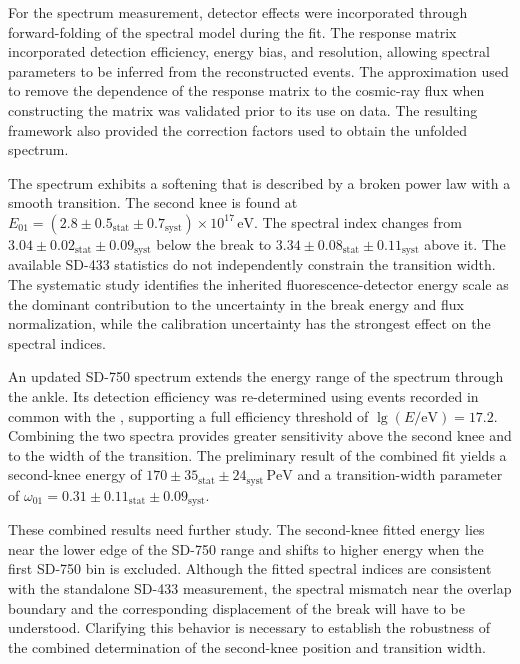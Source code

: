 \documentclass[main.tex]{subfiles}
\begin{document}
For the spectrum measurement, detector effects were incorporated through forward-folding of the spectral model during the fit.
The response matrix incorporated detection efficiency, energy bias, and resolution, allowing spectral parameters to be inferred from the reconstructed events.
The approximation used to remove the dependence of the response matrix to the cosmic-ray flux when constructing the matrix was validated prior to its use on data. 
The resulting framework also provided the correction factors used to obtain the unfolded spectrum.

The  spectrum exhibits a softening that is described by a broken power law with a smooth transition. 
The second knee is found at $E_{01}=(2.8\pm0.5_{\mathrm{stat}}\pm0.7_{\mathrm{syst}})\times10^{17}\,\mathrm{eV}$.
The spectral index changes from \(3.04\pm0.02_{\mathrm{stat}}\pm0.09_{\mathrm{syst}}\) below the break to \(3.34\pm0.08_{\mathrm{stat}}\pm0.11_{\mathrm{syst}}\) above it. The available SD-433 statistics do not independently constrain the transition width. The systematic study identifies the inherited fluorescence-detector energy scale as the dominant contribution to the uncertainty in the break energy and flux normalization, while the calibration uncertainty has the strongest effect on the spectral indices.

An updated SD-750 spectrum extends the energy range of the spectrum through the ankle. Its detection efficiency was re-determined using events recorded in common with the , supporting a full efficiency threshold of $\lg(E/\text{eV})=17.2$.
Combining the two spectra provides greater sensitivity above the second knee and to the width of the transition.
The preliminary result of the combined fit yields a second-knee energy of \(170\pm35_{\mathrm{stat}}\pm24_{\mathrm{syst}}\,\mathrm{PeV}\) and a transition-width parameter of \(\omega_{01}=0.31\pm0.11_{\mathrm{stat}}\pm0.09_{\mathrm{syst}}\).

These combined results need further study. The second-knee fitted energy lies near the lower edge of the SD-750 range and shifts to higher energy when the first SD-750 bin is excluded. Although the fitted spectral indices are consistent with the standalone SD-433 measurement, the spectral mismatch near the overlap boundary and the corresponding displacement of the break will have to be understood. Clarifying this behavior is necessary to establish the robustness of the combined determination of the second-knee position and transition width.
\end{document}
